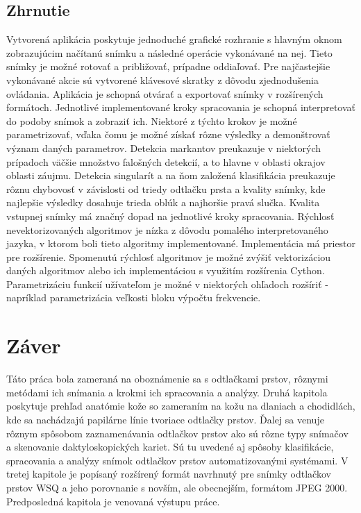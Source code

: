   \section{Zhrnutie}
  Vytvorená aplikácia poskytuje jednoduché grafické rozhranie s hlavným oknom zobrazujúcim načítanú snímku a následné operácie vykonávané na nej.
  Tieto snímky je možné rotovať a približovať, prípadne oddiaľovať. Pre najčastejšie vykonávané akcie sú vytvorené klávesové skratky z dôvodu zjednodušenia
  ovládania.
  Aplikácia je schopná otvárať a exportovať snímky v rozšírených formátoch. Jednotlivé implementované kroky spracovania je schopná interpretovať
  do podoby snímok a zobraziť ich. Niektoré z týchto krokov je možné parametrizovať, vďaka čomu je možné získať rôzne výsledky a demonštrovať význam daných
  parametrov. Detekcia markantov preukazuje v niektorých prípadoch väčšie množstvo falošných detekcií, a to hlavne v oblasti okrajov oblasti záujmu.
  Detekcia singularít a na ňom založená klasifikácia preukazuje rôznu chybovosť v závislosti od triedy odtlačku prsta a kvality snímky,
  kde najlepšie výsledky dosahuje trieda oblúk a najhoršie pravá slučka. Kvalita vstupnej snímky má značný dopad na jednotlivé kroky spracovania.
  Rýchlosť nevektorizovaných algoritmov je nízka z dôvodu pomalého interpretovaného jazyka, v ktorom boli tieto algoritmy implementované.
  Implementácia má priestor pre rozšírenie. Spomenutú rýchlosť algoritmov je možné zvýšiť vektorizáciou daných algoritmov alebo ich implementáciou
  s využitím rozšírenia Cython. Parametrizáciu funkcií užívateľom je možné v niektorých ohľadoch rozšíriť - napríklad parametrizácia veľkosti bloku výpočtu
  frekvencie.

  \chapter{Záver}
  Táto práca bola zameraná na oboznámenie sa s odtlačkami prstov, rôznymi metódami ich snímania a krokmi ich spracovania a analýzy. Druhá kapitola poskytuje
  prehľad anatómie kože so zameraním na kožu na dlaniach a chodidlách, kde sa nachádzajú papilárne línie tvoriace odtlačky prstov. Ďalej sa venuje rôznym
  spôsobom zaznamenávania odtlačkov prstov ako sú rôzne typy snímačov a skenovanie daktyloskopických kariet. Sú tu uvedené aj spôsoby klasifikácie, spracovania
  a analýzy snímok odtlačkov prstov automatizovanými systémami. V tretej kapitole je popísaný rozšírený formát navrhnutý pre snímky odtlačkov prstov WSQ a jeho
  porovnanie s novším, ale obecnejším, formátom JPEG 2000. Predposledná kapitola je venovaná výstupu práce.

